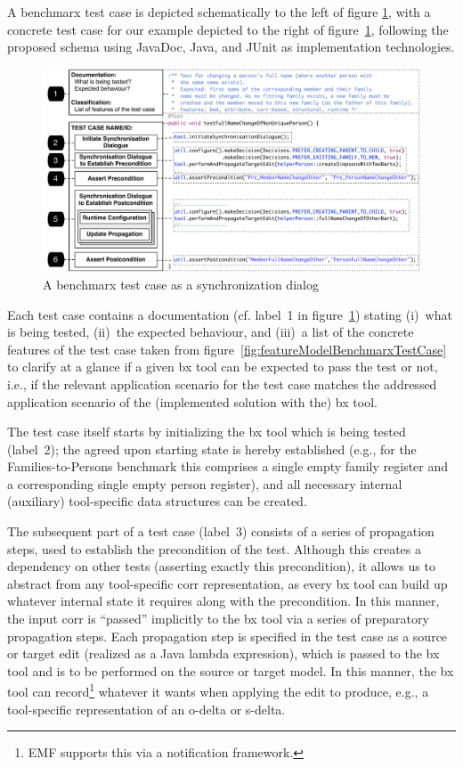 A benchmarx test case is depicted schematically to the left of figure \ref{fig:benchmarxTestCase}, with a concrete test case for our example depicted to the right of figure~\ref{fig:benchmarxTestCase}, following the proposed schema using JavaDoc, Java, and JUnit as implementation technologies.
%
\begin{figure}[tb!]
	\centering
	\includegraphics[width=\columnwidth]{diagrams/benchmarx/testCase}
	\caption{A benchmarx test case as a synchronization dialog}
	\label{fig:benchmarxTestCase}
\end{figure}
%
Each test case contains a documentation (cf. label~1 in figure~\ref{fig:benchmarxTestCase}) stating (i)~what is being tested, (ii)~the expected behaviour, and (iii)~a list of the concrete features of the test case taken from figure~\ref{fig:featureModelBenchmarxTestCase} to clarify at a glance if a given bx tool can be expected to pass the test or not, i.e., if the relevant application scenario for the test case matches the addressed application scenario of the (implemented solution with the) bx tool. 

The test case itself starts by initializing the bx tool which is being tested (label~2); the agreed upon starting state is hereby established (e.g., for the Families-to-Persons benchmark this comprises a single empty family register and a corresponding single empty person register), and all necessary internal (auxiliary) tool-specific data structures can be created.


The subsequent part of a test case (label~3) consists of a series of propagation steps, used to establish the precondition of the test. 
Although this creates a dependency on other tests (asserting exactly this precondition), it allows us to abstract from any tool-specific corr representation, as every bx tool can build up whatever internal state it requires along with the precondition. 
In this manner, the input corr is ``passed'' implicitly to the bx tool via a series of preparatory propagation steps.
Each propagation step is specified in the test case as a source or target edit (realized as a Java lambda expression), which is passed to the bx tool and is to be performed on the source or target model.
In this manner, the bx tool can record\footnote{EMF supports this via a notification framework.} whatever it wants when applying the edit to produce, e.g., a tool-specific representation of an o-delta or s-delta.

